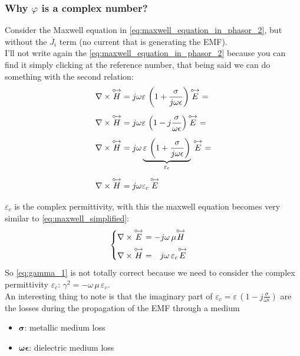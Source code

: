 \subsubsection*{Why $\varphi$ is a complex number?}
Consider the Maxwell equation in \cref{eq:maxwell_equation_in_phasor_2}, but without the $\overline{J}_i$ term (no current that is generating the EMF).\\
I'll not write again the \cref{eq:maxwell_equation_in_phasor_2} because you can find it simply clicking at the reference number, that being said we can do something with the second relation:
\begin{align}
    \begin{split}
        &\nabla\times\overset{\mathbin {{\circ \mkern-2.5mu\rightarrow}}}{H}=j\omega \varepsilon\,\left(1+\frac{\sigma}{j\omega \epsilon}\right)\overset{\mathbin {{\circ \mkern-2.5mu\rightarrow}}}{E}=\\[5pt]
        &\nabla\times\overset{\mathbin {{\circ \mkern-2.5mu\rightarrow}}}{H}=j\omega \varepsilon\,\left(1-j\frac{\sigma}{\omega \epsilon}\right)\overset{\mathbin {{\circ \mkern-2.5mu\rightarrow}}}{E}=\\[5pt]
        &\nabla\times\overset{\mathbin {{\circ \mkern-2.5mu\rightarrow}}}{H}=j\omega \underbrace{\varepsilon\,\left(1+\frac{\sigma}{j\omega \epsilon}\right)}_{\varepsilon_c}\,\overset{\mathbin {{\circ \mkern-2.5mu\rightarrow}}}{E}=\\[5pt]
        &\nabla\times\overset{\mathbin {{\circ \mkern-2.5mu\rightarrow}}}{H}=j\omega \varepsilon_c\,\overset{\mathbin {{\circ \mkern-2.5mu\rightarrow}}}{E}\\[5pt]
    \end{split}
\end{align}
$\varepsilon_c$ is the complex permittivity, with this the maxwell equation becomes very similar to \cref{eq:maxwell_simplified}:
\begin{equation}\label{eq:maxwell_equation_in_phasor_simplified}
    \begin{cases}
    \nabla\times\overset{\mathbin {{\circ \mkern-2.5mu\rightarrow}}}{E}=-j\omega\,\mu \overset{\mathbin {{\circ \mkern-2.5mu\rightarrow}}}{H}\\[5pt]
    \nabla\times\overset{\mathbin {{\circ \mkern-2.5mu\rightarrow}}}{H}=\;\;\,j\omega \, \varepsilon_c\overset{\mathbin {{\circ \mkern-2.5mu\rightarrow}}}{E}
    \end{cases}
\end{equation}
So \cref{eq:gamma_1} is not totally correct because we need to consider the complex permittivity $\varepsilon_c$: $\gamma^2=-\omega\,\mu\,\varepsilon_c$.\\
An interesting thing to note is that the imaginary part of $\varepsilon_c=\varepsilon\,\left(1-j\frac{\sigma}{\omega \epsilon}\right)$ are the losses during the propagation of the EMF through a medium
\begin{itemize}
    \item $\bm{\sigma}$: metallic medium loss
    \item $\bm{\omega \epsilon}$: dielectric medium loss
\end{itemize}
